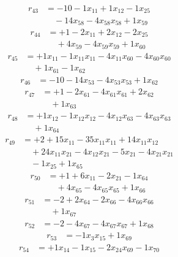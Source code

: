 \[\begin{aligned}
r_{43} &= - 10 - 1 x_{11} + 1 x_{12} - 1 x_{25} \\
 &\quad - 14 x_{58} - 4 x_{58} x_{58} + 1 x_{59}
\end{aligned}\]
\[\begin{aligned}
r_{44} &= + 1 - 2 x_{11} + 2 x_{12} - 2 x_{25} \\
 &\quad + 4 x_{59} - 4 x_{59} x_{59} + 1 x_{60}
\end{aligned}\]
\[\begin{aligned}
r_{45} &= + 1 x_{11} - 1 x_{11} x_{11} - 4 x_{11} x_{60} - 4 x_{60} x_{60} \\
 &\quad + 1 x_{61} - 1 x_{62}
\end{aligned}\]
\[\begin{aligned}
r_{46} &= - 10 - 14 x_{53} - 4 x_{53} x_{53} + 1 x_{62}
\end{aligned}\]
\[\begin{aligned}
r_{47} &= + 1 - 2 x_{61} - 4 x_{61} x_{61} + 2 x_{62} \\
 &\quad + 1 x_{63}
\end{aligned}\]
\[\begin{aligned}
r_{48} &= + 1 x_{12} - 1 x_{12} x_{12} - 4 x_{12} x_{63} - 4 x_{63} x_{63} \\
 &\quad + 1 x_{64}
\end{aligned}\]
\[\begin{aligned}
r_{49} &= + 2 + 15 x_{11} - 35 x_{11} x_{11} + 14 x_{11} x_{12} \\
 &\quad + 24 x_{11} x_{21} - 4 x_{12} x_{21} - 5 x_{21} - 4 x_{21} x_{21} \\
 &\quad - 1 x_{25} + 1 x_{65}
\end{aligned}\]
\[\begin{aligned}
r_{50} &= + 1 + 6 x_{11} - 2 x_{21} - 1 x_{64} \\
 &\quad + 4 x_{65} - 4 x_{65} x_{65} + 1 x_{66}
\end{aligned}\]
\[\begin{aligned}
r_{51} &= - 2 + 2 x_{64} - 2 x_{66} - 4 x_{66} x_{66} \\
 &\quad + 1 x_{67}
\end{aligned}\]
\[\begin{aligned}
r_{52} &= - 2 - 4 x_{67} - 4 x_{67} x_{67} + 1 x_{68}
\end{aligned}\]
\[\begin{aligned}
r_{53} &= - 1 x_{3} x_{15} + 1 x_{69}
\end{aligned}\]
\[\begin{aligned}
r_{54} &= + 1 x_{14} - 1 x_{15} - 2 x_{24} x_{69} - 1 x_{70}
\end{aligned}\]
